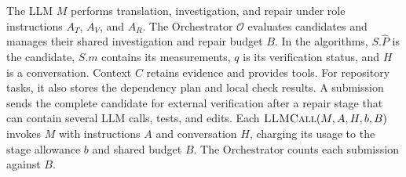 The LLM $M$ performs translation, investigation, and repair under role instructions $A_T$, $A_V$, and $A_R$. The Orchestrator $\mathcal O$ evaluates candidates and manages their shared investigation and repair budget $B$. In the algorithms, $S.\hat P$ is the candidate, $S.m$ contains its measurements, $q$ is its verification status, and $H$ is a conversation. Context $C$ retains evidence and provides tools. For repository tasks, it also stores the dependency plan and local check results. A submission sends the complete candidate for external verification after a repair stage that can contain several LLM calls, tests, and edits. Each $\textsc{LLMCall}(M,A,H,b,B)$ invokes $M$ with instructions $A$ and conversation $H$, charging its usage to the stage allowance $b$ and shared budget $B$. The Orchestrator counts each submission against $B$.

